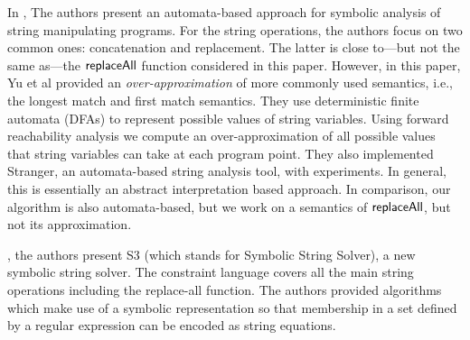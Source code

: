 In \cite{YABI14}, %
The authors present an automata-based approach for symbolic analysis of string manipulating programs. For the string operations, the authors focus on two common ones: concatenation and replacement. The latter is close to---but not the same as---the $\mathsf{replaceAll}$ function considered in this paper. However, in this paper, Yu et al provided   an \emph{over-approximation} of more %
commonly used semantics, i.e., the longest match and first match semantics. 
%
%
They use deterministic finite automata (DFAs) to represent possible values of string variables. Using forward reachability analysis we compute an over-approximation of all possible values that string variables can take at each program point. They also implemented Stranger, an automata-based string analysis tool, with experiments. In general, this is essentially an abstract interpretation based approach.  In comparison, our algorithm is also automata-based, but we work on a semantics of $\mathsf{replaceAll}$, but not its approximation. 


 
\cite{TCJ14}, the authors present S3 (which stands for Symbolic String Solver), a new symbolic string solver.
The constraint language covers all the main string operations including the replace-all function. The authors 
provided algorithms which make use of a symbolic representation so that membership in a set defined by a regular expression can be encoded as string equations. 

